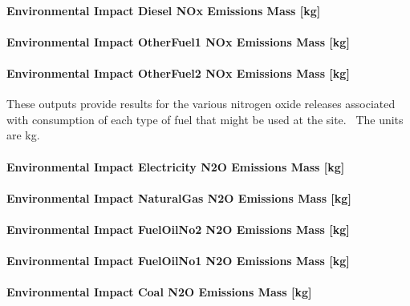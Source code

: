 \paragraph{Environmental Impact Diesel NOx Emissions Mass {[}kg{]}}\label{environmental-impact-diesel-nox-emissions-mass-kg}

\paragraph{Environmental Impact OtherFuel1 NOx Emissions Mass {[}kg{]}}\label{environmental-impact-otherfuel1-nox-emissions-mass-kg}

\paragraph{Environmental Impact OtherFuel2 NOx Emissions Mass {[}kg{]}}\label{environmental-impact-otherfuel2-nox-emissions-mass-kg}

These outputs provide results for the various nitrogen oxide releases associated with consumption of each type of fuel that might be used at the site.~ The units are kg.

\paragraph{Environmental Impact Electricity N2O Emissions Mass {[}kg{]}}\label{environmental-impact-electricity-n2o-emissions-mass-kg}

\paragraph{Environmental Impact NaturalGas N2O Emissions Mass {[}kg{]}}\label{environmental-impact-natural-gas-n2o-emissions-mass-kg}

\paragraph{Environmental Impact FuelOilNo2 N2O Emissions Mass {[}kg{]}}\label{environmental-impact-fuel-oil-2-n2o-emissions-mass-kg}

\paragraph{Environmental Impact FuelOilNo1 N2O Emissions Mass {[}kg{]}}\label{environmental-impact-fuel-oil-1-n2o-emissions-mass-kg}

\paragraph{Environmental Impact Coal N2O Emissions Mass {[}kg{]}}\label{environmental-impact-coal-n2o-emissions-mass-kg}

